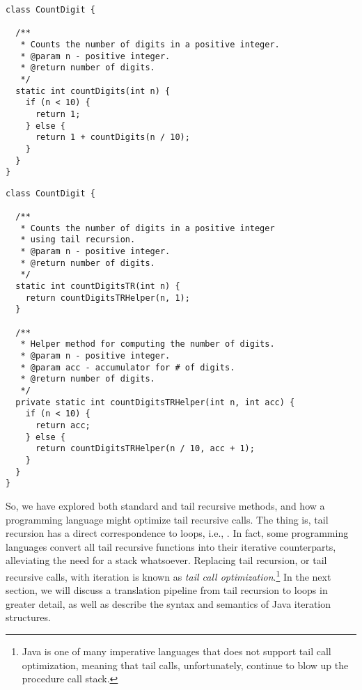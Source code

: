 \begin{lstlisting}[language=MyJava]
class CountDigit {

  /**
   * Counts the number of digits in a positive integer.
   * @param n - positive integer.
   * @return number of digits.
   */
  static int countDigits(int n) {
    if (n < 10) {
      return 1;
    } else {
      return 1 + countDigits(n / 10);
    }
  }
}
\end{lstlisting}

\begin{lstlisting}[language=MyJava]
class CountDigit {

  /**
   * Counts the number of digits in a positive integer
   * using tail recursion.
   * @param n - positive integer.
   * @return number of digits.
   */
  static int countDigitsTR(int n) {
    return countDigitsTRHelper(n, 1);
  }

  /**
   * Helper method for computing the number of digits.
   * @param n - positive integer.
   * @param acc - accumulator for # of digits.
   * @return number of digits.
   */
  private static int countDigitsTRHelper(int n, int acc) {
    if (n < 10) {
      return acc;
    } else {
      return countDigitsTRHelper(n / 10, acc + 1);
    }
  }
}
\end{lstlisting}

So, we have explored both standard and tail recursive methods, and how a programming language might optimize tail recursive calls. 
The thing is, tail recursion has a direct correspondence to loops, i.e., . 
In fact, some programming languages convert all tail recursive functions into their iterative counterparts, alleviating the need for a stack whatsoever.
Replacing tail recursion, or tail recursive calls, with iteration is known as \emph{tail call optimization}.\footnote{Java is one of many imperative languages that does not support tail call optimization, meaning that tail calls, unfortunately, continue to blow up the procedure call stack.} 
In the next section, we will discuss a translation pipeline from tail recursion to loops in greater detail, as well as describe the syntax and semantics of Java iteration structures.

  
